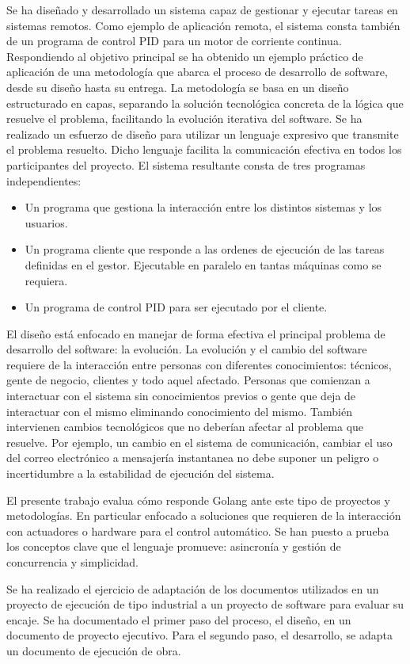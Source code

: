 
Se ha diseñado y desarrollado un sistema capaz de gestionar y ejecutar tareas en sistemas remotos.
Como ejemplo de aplicación remota, el sistema consta también de un programa de control PID para un motor de corriente continua.
Respondiendo al objetivo principal se ha obtenido un ejemplo práctico de aplicación de una metodología que abarca el proceso de desarrollo de software, desde su diseño hasta su entrega.
La metodología se basa en un diseño estructurado en capas, separando la solución tecnológica concreta de la lógica que resuelve el problema, facilitando la evolución iterativa del software.
Se ha realizado un esfuerzo de diseño para utilizar un lenguaje expresivo que transmite el problema resuelto.
Dicho lenguaje facilita la comunicación efectiva en todos los participantes del proyecto.
El sistema resultante consta de tres programas independientes:

\begin{itemize}
    \item Un programa que gestiona la interacción entre los distintos sistemas y los usuarios.
    \item Un programa cliente que responde a las ordenes de ejecución de las tareas definidas en el gestor.
    Ejecutable en paralelo en tantas máquinas como se requiera.
    \item Un programa de control PID para ser ejecutado por el cliente.
\end{itemize}

El diseño está enfocado en manejar de forma efectiva el principal problema de desarrollo del software: la evolución.
La evolución y el cambio del software requiere de la interacción entre personas con diferentes conocimientos: técnicos, gente de negocio, clientes y todo aquel afectado.
Personas que comienzan a interactuar con el sistema sin conocimientos previos o gente que deja de interactuar con el mismo eliminando conocimiento del mismo.
También intervienen cambios tecnológicos que no deberían afectar al problema que resuelve.
Por ejemplo, un cambio en el sistema de comunicación, cambiar el uso del correo electrónico a mensajería instantanea no debe suponer un peligro o incertidumbre a la estabilidad de ejecución del sistema.

El presente trabajo evalua cómo responde Golang ante este tipo de proyectos y metodologías.
En particular enfocado a soluciones que requieren de la interacción con actuadores o hardware para el control automático.
Se han puesto a prueba los conceptos clave que el lenguaje promueve: asincronía y gestión de concurrencia y simplicidad.

Se ha realizado el ejercicio de adaptación de los documentos utilizados en un proyecto de ejecución de tipo industrial a un proyecto de software para evaluar su encaje.
Se ha documentado el primer paso del proceso, el diseño, en un documento de proyecto ejecutivo.
Para el segundo paso, el desarrollo, se adapta un documento de ejecución de obra.


